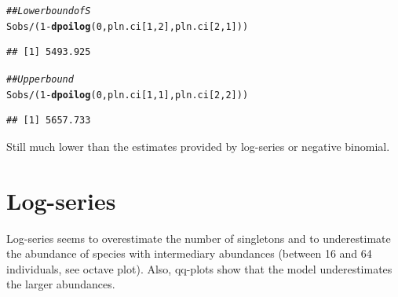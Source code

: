 \documentclass[12pt, A4]{article}\usepackage[]{graphicx}\usepackage[]{color}
\makeatletter
\newcommand{\hlnum}[1]{\textcolor[rgb]{0.686,0.059,0.569}{#1}}%
\newcommand{\hlcom}[1]{\textcolor[rgb]{0.678,0.584,0.686}{\textit{#1}}}%
\newcommand{\hlopt}[1]{\textcolor[rgb]{0,0,0}{#1}}%
\newcommand{\hlstd}[1]{\textcolor[rgb]{0.345,0.345,0.345}{#1}}%
\newcommand{\hlkwd}[1]{\textcolor[rgb]{0.737,0.353,0.396}{\textbf{#1}}}%
\newenvironment{kframe}{%
 \def\at@end@of@kframe{}%
 \ifinner\ifhmode%
  \def\at@end@of@kframe{\end{minipage}}%
  \begin{minipage}{\columnwidth}%
 \fi\fi%
 \def\FrameCommand##1{\hskip\@totalleftmargin \hskip-\fboxsep
 \colorbox{shadecolor}{##1}\hskip-\fboxsep
     \hskip-\linewidth \hskip-\@totalleftmargin \hskip\columnwidth}%
 \MakeFramed {\advance\hsize-\width
   \@totalleftmargin\z@ \linewidth\hsize
   \@setminipage}}%
 {\par\unskip\endMakeFramed%
 \at@end@of@kframe}
\newenvironment{knitrout}{}{} %
\makeatother
\begin{document}
\begin{knitrout}
\color{fgcolor}\begin{kframe}
\begin{alltt}
\hlcom{## Lower bound of S}
\hlstd{Sobs} \hlopt{/} \hlstd{(}\hlnum{1} \hlopt{-} \hlkwd{dpoilog}\hlstd{(}\hlnum{0}\hlstd{, pln.ci[}\hlnum{1}\hlstd{,}\hlnum{2}\hlstd{], pln.ci[}\hlnum{2}\hlstd{,}\hlnum{1}\hlstd{]))}
\end{alltt}
\begin{verbatim}
## [1] 5493.925
\end{verbatim}
\begin{alltt}
\hlcom{## Upper bound}
\hlstd{Sobs} \hlopt{/} \hlstd{(}\hlnum{1} \hlopt{-} \hlkwd{dpoilog}\hlstd{(}\hlnum{0}\hlstd{, pln.ci[}\hlnum{1}\hlstd{,}\hlnum{1}\hlstd{], pln.ci[}\hlnum{2}\hlstd{,}\hlnum{2}\hlstd{]))}
\end{alltt}
\begin{verbatim}
## [1] 5657.733
\end{verbatim}
\end{kframe}
\end{knitrout}

Still much lower than the estimates provided by log-series or negative binomial.

\section*{Log-series}

Log-series seems to overestimate the number of singletons
and to underestimate the abundance of species with intermediary abundances
(between 16 and 64 individuals, see octave plot). Also, qq-plots show that
the model underestimates the larger abundances.
\end{document}
